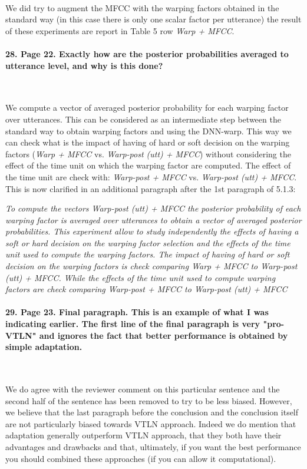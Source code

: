 \documentclass[]{article}
\begin{document}
~

We did try to augment the MFCC with the warping factors obtained in the standard way (in this case there is only one scalar factor per utterance) the result of these experiments are report in Table 5 row {\em Warp + MFCC}.

\paragraph{28. Page 22. Exactly how are the posterior probabilities averaged to utterance level, and why is this done?}

~

We compute a vector of averaged posterior probability for each warping factor over utterances. This can be considered as an intermediate step between the standard way to obtain warping factors and using the DNN-warp. This way we can check what is the impact of having of hard or soft decision on the warping factors ({\em Warp + MFCC} vs. {\em Warp-post (utt) + MFCC}) without considering the effect of the time unit on which the warping factor are computed. The effect of the time unit are check with: {\em Warp-post + MFCC} vs. {\em Warp-post (utt) + MFCC}. This is now clarified in an additional paragraph after the 1st paragraph of 5.1.3:

\textit{To compute the vectors {\em Warp-post (utt) + MFCC} the posterior probability of each warping factor is averaged over utterances to obtain a vector of averaged posterior probabilities. This experiment allow to study independently the effects of having a soft or hard decision on the warping factor selection and the effects of the time unit used to compute the warping factors. The impact of having of hard or soft decision on the warping factors is check comparing {\em Warp + MFCC} to {\em Warp-post (utt) + MFCC}. While the effects of the time unit used to compute warping factors are check comparing {\em Warp-post + MFCC} to {\em Warp-post (utt) + MFCC}}


\paragraph{29. Page 23. Final paragraph. This is an example of what I was indicating earlier. The first line of the final paragraph is very "pro-VTLN" and ignores the fact that better performance is obtained by simple adaptation.}

~

We do agree with the reviewer comment on this particular sentence and the second half of the sentence has been removed to try to be less biased. However, we believe that the last paragraph before the conclusion and the conclusion itself are not particularly biased towards VTLN approach. Indeed we do mention that adaptation generally outperform VTLN approach, that they both have their advantages and drawbacks and that, ultimately, if you want the best performance you should combined these approaches (if you can allow it computational).
\end{document}
